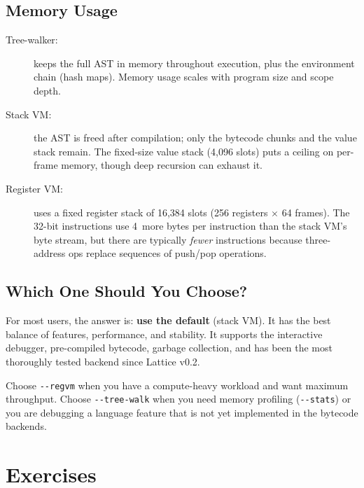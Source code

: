 \subsection{Memory Usage}

\begin{description}
  \item[Tree-walker:] keeps the full AST in memory throughout execution, plus
    the environment chain (hash maps). Memory usage scales with program size
    and scope depth.

  \item[Stack VM:] the AST is freed after compilation; only the bytecode chunks
    and the value stack remain. The fixed-size value stack (4{,}096 slots) puts
    a ceiling on per-frame memory, though deep recursion can exhaust it.

  \item[Register VM:] uses a fixed register stack of 16{,}384 slots (256
    registers $\times$ 64 frames). The 32-bit instructions use 4\texttimes\
    more bytes per instruction than the stack VM's byte stream, but there are
    typically \emph{fewer} instructions because three-address ops replace
    sequences of push/pop operations.
\end{description}

\subsection{Which One Should You Choose?}

For most users, the answer is: \textbf{use the default} (stack VM). It has
the best balance of features, performance, and stability. It supports the
interactive debugger, pre-compiled bytecode, garbage collection, and has been
the most thoroughly tested backend since Lattice v0.2.

Choose \lstinline|--regvm| when you have a compute-heavy workload and want
maximum throughput. Choose \lstinline|--tree-walk| when you need memory
profiling (\lstinline|--stats|) or you are debugging a language feature that
is not yet implemented in the bytecode backends.

\section{Exercises}\label{sec:backends-exercises}


